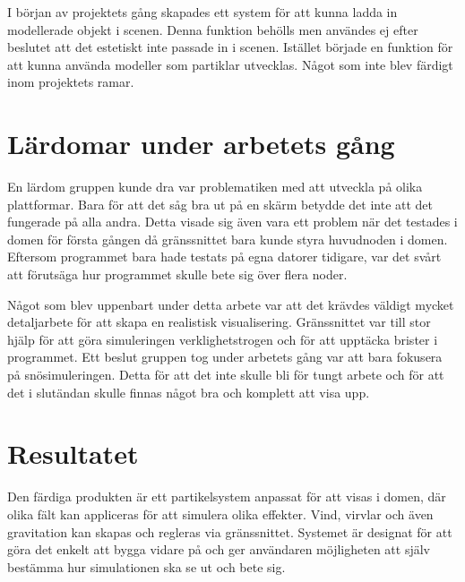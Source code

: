 \documentclass[12pt,a4paper]{article}
\begin{document}
	I början av projektets gång skapades ett system för att kunna ladda in modellerade objekt i scenen. Denna funktion behölls men användes ej efter beslutet att det estetiskt inte passade in i scenen. Istället började en funktion för att kunna använda modeller som partiklar utvecklas. Något som inte blev färdigt inom projektets ramar.

\section*{Lärdomar under arbetets gång}
	En lärdom gruppen kunde dra var problematiken med att utveckla på olika plattformar. Bara för att det såg bra ut på en skärm betydde det inte att det fungerade på alla andra. Detta visade sig även vara ett problem när det testades i domen för första gången då gränssnittet bara kunde styra huvudnoden i domen. Eftersom programmet bara hade testats på egna datorer tidigare, var det svårt att förutsäga hur programmet skulle bete sig över flera noder.

	Något som blev uppenbart under detta arbete var att det krävdes väldigt mycket detaljarbete för att skapa en realistisk visualisering. Gränssnittet var till stor hjälp för att göra simuleringen verklighetstrogen och för att upptäcka brister i programmet. Ett beslut gruppen tog under arbetets gång var att bara fokusera på snösimuleringen. Detta för att det inte skulle bli för tungt arbete och för att det i slutändan skulle finnas något bra och komplett att visa upp.

\section*{Resultatet}
	Den färdiga produkten är ett partikelsystem anpassat för att visas i domen, där olika fält kan appliceras för att simulera olika effekter. Vind, virvlar och även gravitation kan skapas och regleras via gränssnittet. Systemet är designat för att göra det enkelt att bygga vidare på och ger användaren möjligheten att själv bestämma hur simulationen ska se ut och bete sig.
\end{document}
